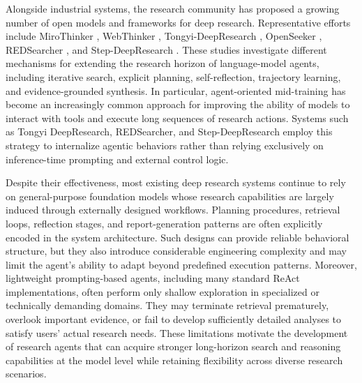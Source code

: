 \documentclass{huawei}
\begin{document}
Alongside industrial systems, the research community has proposed a growing number of open models and frameworks for deep research. Representative efforts include MiroThinker \cite{team2026mirothinker}, WebThinker \cite{li2026webthinker}, Tongyi-DeepResearch \cite{team2025tongyi}, OpenSeeker \cite{du2026openseeker}, REDSearcher \cite{chu2026redsearcher}, and Step-DeepResearch \cite{hu2025step}. These studies investigate different mechanisms for extending the research horizon of language-model agents, including iterative search, explicit planning, self-reflection, trajectory learning, and evidence-grounded synthesis. In particular, agent-oriented mid-training has become an increasingly common approach for improving the ability of models to interact with tools and execute long sequences of research actions. Systems such as Tongyi DeepResearch, REDSearcher, and Step-DeepResearch employ this strategy to internalize agentic behaviors rather than relying exclusively on inference-time prompting and external control logic.

Despite their effectiveness, most existing deep research systems continue to rely on general-purpose foundation models whose research capabilities are largely induced through externally designed workflows. Planning procedures, retrieval loops, reflection stages, and report-generation patterns are often explicitly encoded in the system architecture. Such designs can provide reliable behavioral structure, but they also introduce considerable engineering complexity and may limit the agent's ability to adapt beyond predefined execution patterns. Moreover, lightweight prompting-based agents, including many standard ReAct implementations, often perform only shallow exploration in specialized or technically demanding domains. They may terminate retrieval prematurely, overlook important evidence, or fail to develop sufficiently detailed analyses to satisfy users' actual research needs. These limitations motivate the development of research agents that can acquire stronger long-horizon search and reasoning capabilities at the model level while retaining flexibility across diverse research scenarios.

\iffalse
\end{document}
